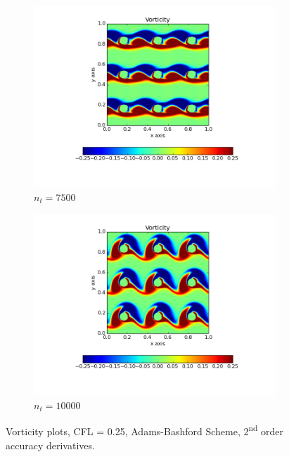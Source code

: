 \documentclass[10pt, a4paper]{article}
\begin{document}
\begin{figure}[htb!]
\begin{subfigure}{.5\textwidth}
  \includegraphics[width=1.1\linewidth, clip=true, trim=1cm 1cm 1cm 1cm]{q1_0003}
  \caption{$n_t = 7500$}
  \label{fig:sub1}
\end{subfigure}%
\begin{subfigure}{.5\textwidth}
  \centering
  \includegraphics[width=1.1\linewidth, clip=true, trim=1cm 1cm 1cm 1cm]{q1_0004}
  \caption{$n_t = 10000$}
  \label{fig:sub2}
\end{subfigure}
\caption{Vorticity plots, CFL = 0.25, Adams-Bashford Scheme, 2\textsuperscript{nd} order accuracy derivatives.}
\label{fig:test}
\end{figure}

\newpage
\end{document}
